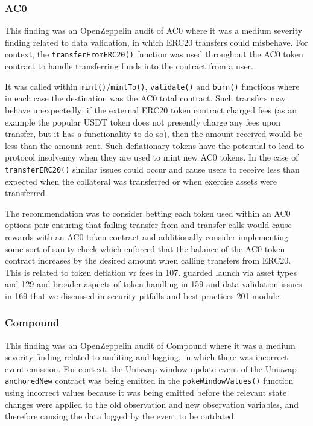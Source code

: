 \subsubsection{AC0}\label{ac0}

This finding was an OpenZeppelin audit of AC0 where it was a medium
severity finding related to data validation, in which ERC20 transfers
could misbehave. For context, the \texttt{transferFromERC20()} function
was used throughout the AC0 token contract to handle transferring funds
into the contract from a user.

It was called within \texttt{mint()}/\texttt{mintTo()},
\texttt{validate()} and \texttt{burn()} functions where in each case the
destination was the AC0 total contract. Such transfers may behave
unexpectedly: if the external ERC20 token contract charged fees (as an
example the popular USDT token does not presently charge any fees upon
transfer, but it has a functionality to do so), then the amount received
would be less than the amount sent. Such deflationary tokens have the
potential to lead to protocol insolvency when they are used to mint new
AC0 tokens. In the case of \texttt{transferERC20()} similar issues could
occur and cause users to receive less than expected when the collateral
was transferred or when exercise assets were transferred.

The recommendation was to consider betting each token used within an AC0
options pair ensuring that failing transfer from and transfer calls
would cause rewards with an AC0 token contract and additionally consider
implementing some sort of sanity check which enforced that the balance
of the AC0 token contract increases by the desired amount when calling
transfers from ERC20. This is related to token deflation vr fees in 107.
guarded launch via asset types and 129 and broader aspects of token
handling in 159 and data validation issues in 169 that we discussed in
security pitfalls and best practices 201 module.

\subsubsection{Compound}\label{compound}

This finding was an OpenZeppelin audit of Compound where it was a medium
severity finding related to auditing and logging, in which there was
incorrect event emission. For context, the Uniswap window update event
of the Uniswap \texttt{anchoredNew} contract was being emitted in the
\texttt{pokeWindowValues()} function using incorrect values because it
was being emitted before the relevant state changes were applied to the
old observation and new observation variables, and therefore causing the
data logged by the event to be outdated.

